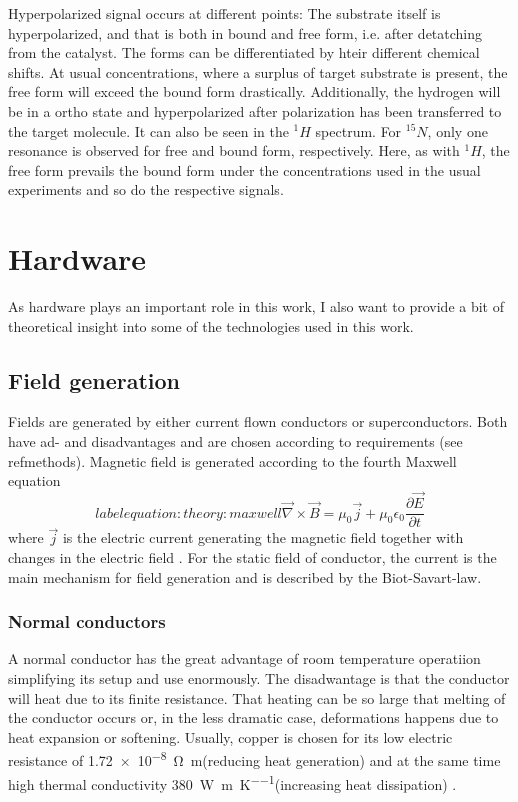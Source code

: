             Hyperpolarized signal occurs at different points: The substrate itself is hyperpolarized, and that is both in bound and free form, i.e. after detatching from the catalyst. The forms can be differentiated by hteir different chemical shifts. At usual concentrations, where a surplus of target substrate is present, the free form will exceed the bound form drastically. Additionally, the hydrogen will be in a ortho state and hyperpolarized after polarization has been transferred to the target molecule. It can also be seen in the $^1H$ spectrum.
            For $^{15}N$, only one resonance is observed for free and bound form, respectively. Here, as with $^1H$, the free form prevails the bound form under the concentrations used in the usual experiments and so do the respective signals.
        \section{Hardware}
            As hardware plays an important role in this work, I also want to provide a bit of theoretical insight into some of the technologies used in this work.
            \subsection{Field generation}
                Fields are generated by either current flown conductors or superconductors. Both have ad- and disadvantages and are chosen according to requirements (see ref{methods}). Magnetic field is generated according to the fourth Maxwell equation
                \begin{equation}
                    label{equation:theory:maxwell}
                    \vec\nabla\times\vec B = \mu_0\vec j+\mu_0\epsilon_0\frac{\partial\vec E}{\partial t}
                \end{equation}
                where $\vec j$ is the electric current generating the magnetic field together with changes in the electric field \cite{b.i._bleaney__b._bleaney_electricity_nodate}. For the static field of conductor, the current is the main mechanism for field generation and is described by the Biot-Savart-law.
            \subsubsection{Normal conductors}
                A normal conductor has the great advantage of room temperature operatiion simplifying its setup and use enormously. The disadwantage is that the conductor will heat due to its finite resistance. That heating can be so large that melting of the conductor occurs or, in the less dramatic case, deformations happens due to heat expansion or softening. Usually, copper is chosen for its low electric resistance of \SI{1.72e-8}{\ohm\meter}(reducing heat generation) and at the same time high thermal conductivity \SI{380}{\watt\per\m\per\kelvin}(increasing heat dissipation) \cite{schofield_f._h._thermal_1925}.
